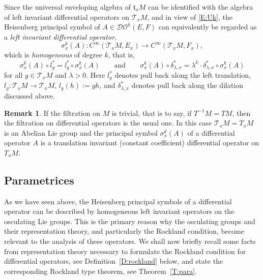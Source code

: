 \documentclass[reqno,12pt]{amsart}
\newcommand{\DO}{\mathcal D\mathcal O}
\theoremstyle{plain}
\theoremstyle{definition}
\newtheorem{remark}[theorem]{Remark}
\begin{document}
Since the universal enveloping algebra of $\mathfrak t_xM$ can be identified with the algebra of left invariant differential operators on $\mathcal T_xM$, and in view of \eqref{E:Uk}, the Heisenberg principal symbol of $A\in\DO^k(E,F)$ can equivalently be regarded as a \emph{left invariant differential operator,}
\begin{equation}\label{E:skA}
\sigma_x^k(A)\colon C^\infty(\mathcal T_xM,E_x)\to C^\infty(\mathcal T_xM,F_x),
\end{equation}
which is \emph{homogeneous} of degree $k$, that is,
\begin{equation}\label{E:skAlg}
\sigma^k_x(A)\circ l_g^*=l_g^*\circ\sigma^k_x(A)
\qquad\text{and}\qquad
\sigma^k_x(A)\circ\delta_{\lambda,x}^*=\lambda^k\cdot\delta_{\lambda,x}^*\circ\sigma^k_x(A)
\end{equation}
for all $g\in\mathcal T_xM$ and $\lambda>0$.
Here $l_g^*$ denotes pull back along the left translation, $l_g\colon\mathcal T_xM\to\mathcal T_xM$, $l_g(h):=gh$, and $\delta_{\lambda,x}^*$ denotes pull back along the dilation discussed above.


\begin{remark}
If the filtration on $M$ is trivial, that is to say, if $T^{-1}M=TM$, then the filtration on differential operators is the usual one.
In this case $\mathcal T_xM=T_xM$ is an Abelian Lie group and the principal symbol $\sigma^k_x(A)$ of a differential operator $A$ is a translation invariant (constant coefficient) differential operator on $T_xM$.
\end{remark}







\subsection{Parametrices}\label{SS:paraDO}







As we have seen above, the Heisenberg principal symbols of a differential operator can be described by homogeneous left invariant operators on the osculating Lie groups.
This is the primary reason why the osculating groups and their representation theory, and particularly the Rockland condition, become relevant to the analysis of these operators.
We shall now briefly recall some facts from representation theory necessary to formulate the Rockland condition for differential operators, see Definition~\ref{D:rockland} below, and state the corresponding Rockland type theorem, see Theorem~\ref{T:para}.
\end{document}
